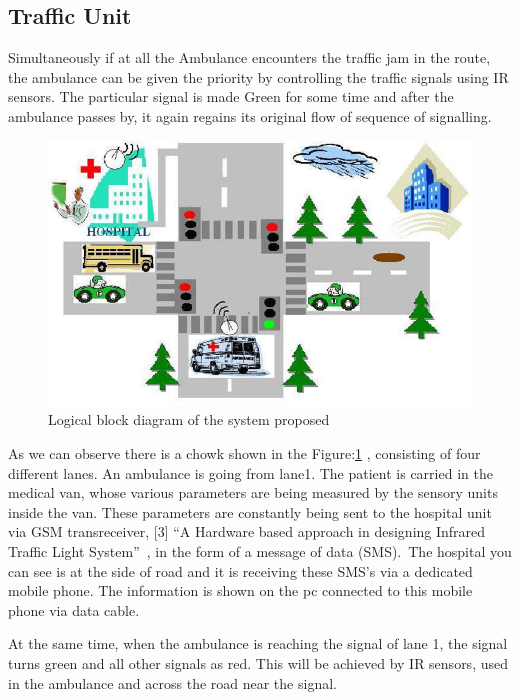 \documentclass[12pt,a4paper,oneside,openright]{report}
\begin{document}
\subsection{Traffic Unit}
Simultaneously if at all the Ambulance encounters the traffic jam in the route, the ambulance can be given the priority by controlling the traffic signals using IR sensors. The particular signal is made Green for some time and after the ambulance passes by, it again regains its original flow of sequence of signalling.
\begin{figure}[!h]
 \centering
 \includegraphics[width = \textwidth]{Figures/fig_1.png}
 \caption{Logical block diagram of the system proposed}
 \label{bdm}
\end{figure}

As we can observe there is a chowk shown in the Figure:\ref{bdm} , consisting of four different lanes. An ambulance is going from lane1. The patient is carried in the medical van, whose various parameters are being measured by the sensory units inside the van. These parameters are constantly being sent to the hospital unit via GSM transreceiver, [3] “A Hardware based approach in designing Infrared Traffic Light System” , in the form of a message of data (SMS). The hospital you can see is at the side of road and it is receiving these SMS’s via a dedicated mobile phone. The information is shown on the pc connected to this mobile phone via data cable.

At the same time, when the ambulance is reaching the signal of lane 1, the signal turns green and all other signals as red. This will be achieved by IR sensors, used in the ambulance and across the road near the signal. 
\end{document}
